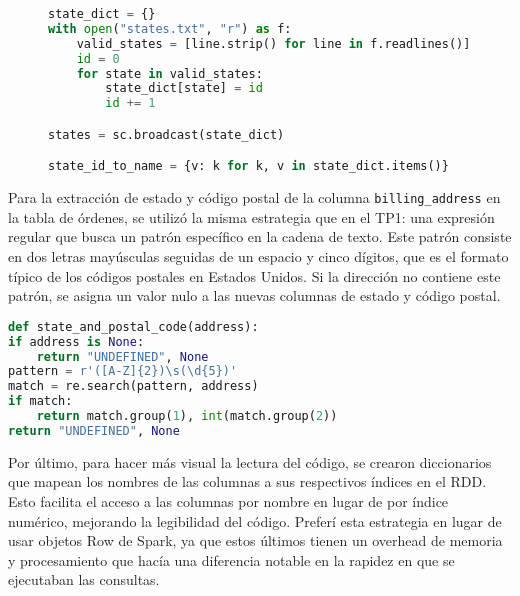 \begin{figure}[H]
\begin{lstlisting}[language=Python, caption=Ejemplo de conversión de columna categórica a ID numérico, label={lst:conversion_categorica}]
state_dict = {}
with open("states.txt", "r") as f:
    valid_states = [line.strip() for line in f.readlines()]
    id = 0
    for state in valid_states:
        state_dict[state] = id
        id += 1

states = sc.broadcast(state_dict)

state_id_to_name = {v: k for k, v in state_dict.items()}
\end{lstlisting}
\end{figure}


Para la extracción de estado y código postal de la columna \texttt{billing\_address} en la tabla de órdenes, se utilizó la misma estrategia que en el TP1: una expresión regular que busca un patrón específico en la cadena de texto. Este patrón consiste en dos letras mayúsculas seguidas de un espacio y cinco dígitos, que es el formato típico de los códigos postales en Estados Unidos. Si la dirección no contiene este patrón, se asigna un valor nulo a las nuevas columnas de estado y código postal.


\begin{lstlisting}[language=Python, caption=Extracción de estado y código postal de la dirección de facturación, label={lst:extraccion_estado_cp}]
def state_and_postal_code(address):
if address is None:
    return "UNDEFINED", None
pattern = r'([A-Z]{2})\s(\d{5})'
match = re.search(pattern, address)
if match:
    return match.group(1), int(match.group(2))
return "UNDEFINED", None
\end{lstlisting}


Por último, para hacer más visual la lectura del código, se crearon diccionarios que mapean los nombres de las columnas a sus respectivos índices en el RDD. Esto facilita el acceso a las columnas por nombre en lugar de por índice numérico, mejorando la legibilidad del código. Preferí esta estrategia en lugar de usar objetos Row de Spark, ya que estos últimos tienen un overhead de memoria y procesamiento que hacía una diferencia notable en la rapidez en que se ejecutaban las consultas.